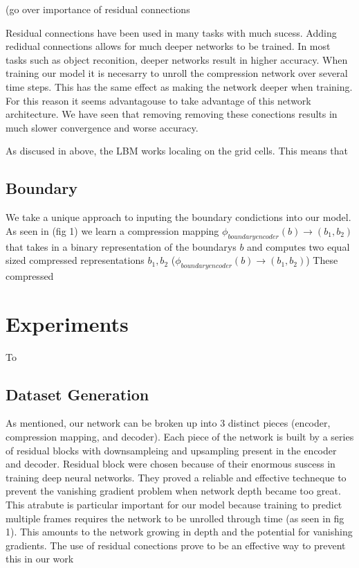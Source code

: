 \documentclass{article}
\begin{document}
(go over importance of residual connections

Residual connections have been used in many tasks with much sucess. Adding redidual connections allows for much deeper networks to be trained. In most tasks such as object reconition, deeper networks result in higher accuracy. When training our model it is necesarry to unroll the compression network over several time steps. This has the same effect as making the network deeper when training. For this reason it seems advantagouse to take advantage of this network architecture. We have seen that removing removing these conections results in much slower convergence and worse accuracy.

As discused in above, the LBM works localing on the grid cells. This means that 

\subsection{Boundary}

We take a unique approach to inputing the boundary condictions into our model. As seen in (fig 1) we learn a compression mapping $\phi_{boundary encoder}(b) \rightarrow (b_1, b_2)$ that takes in a binary representation of the boundarys $b$ and computes two equal sized compressed representations $b_1, b_2$ ($\phi_{boundary encoder}(b) \rightarrow (b_1, b_2)$) These compressed 

\section{Experiments}

To

\subsection{Dataset Generation}
As mentioned, our network can be broken up into 3 distinct pieces (encoder, compression mapping, and decoder). Each piece of the network is built by a series of residual blocks with downsampleing and upsampling present in the encoder and decoder. Residual block were chosen because of their enormous suscess in training deep neural networks. They proved a reliable and effective techneque to prevent the vanishing gradient problem when network depth became too great. This atrabute is particular important for our model because training to predict multiple frames requires the network to be unrolled through time (as seen in fig 1). This amounts to the network growing in depth and the potential for vanishing gradients. The use of residual conections prove to be an effective way to prevent this in our work
\end{document}
